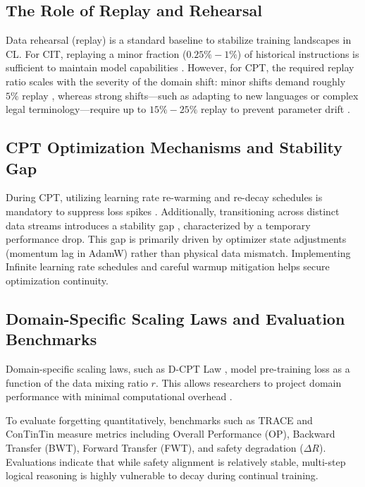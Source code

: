 \subsection{The Role of Replay and Rehearsal}
Data rehearsal (replay) is a standard baseline to stabilize training landscapes in CL. For CIT, replaying a minor fraction ($0.25\% - 1\%$) of historical instructions is sufficient to maintain model capabilities \parencite{scialom-etal-2022-fine}. However, for CPT, the required replay ratio scales with the severity of the domain shift: minor shifts demand roughly $5\%$ replay \parencite{ibrahim2024simplescalablestrategiescontinually}, whereas strong shifts—such as adapting to new languages or complex legal terminology—require up to $15\% - 25\%$ replay to prevent parameter drift \parencite{zheng-etal-2024-breaking}.

\subsection{CPT Optimization Mechanisms and Stability Gap}
During CPT, utilizing learning rate re-warming and re-decay schedules is mandatory to suppress loss spikes \parencite{gupta2023continualpretraininglargelanguage, yildiz2025investigatingcontinualpretraininglarge}. Additionally, transitioning across distinct data streams introduces a stability gap \parencite{du2024unlockingcontinuallearningabilities}, characterized by a temporary performance drop. This gap is primarily driven by optimizer state adjustments (momentum lag in AdamW) rather than physical data mismatch. Implementing Infinite learning rate schedules and careful warmup mitigation helps secure optimization continuity.

\subsection{Domain-Specific Scaling Laws and Evaluation Benchmarks}
Domain-specific scaling laws, such as D-CPT Law \parencite{que2024dcptlawdomainspecificcontinual}, model pre-training loss as a function of the data mixing ratio $r$. This allows researchers to project domain performance with minimal computational overhead \parencite{li2025ticlmwebscalebenchmarktimecontinual, peng2024scalablelanguagemodelgeneralized}. 

To evaluate forgetting quantitatively, benchmarks such as TRACE \parencite{wang2023tracecomprehensivebenchmarkcontinual} and ConTinTin \parencite{yin-etal-2022-contintin} measure metrics including Overall Performance (OP), Backward Transfer (BWT), Forward Transfer (FWT), and safety degradation ($\Delta R$). Evaluations indicate that while safety alignment is relatively stable, multi-step logical reasoning is highly vulnerable to decay during continual training.
